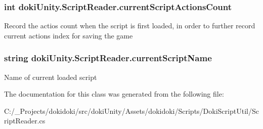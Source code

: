\subsubsection[{\texorpdfstring{current\+Script\+Actions\+Count}{currentScriptActionsCount}}]{\setlength{\rightskip}{0pt plus 5cm}int doki\+Unity.\+Script\+Reader.\+current\+Script\+Actions\+Count}\hypertarget{classdoki_unity_1_1_script_reader_ac9c6272e1333eb07927fc9cfabdbbd72}{}\label{classdoki_unity_1_1_script_reader_ac9c6272e1333eb07927fc9cfabdbbd72}


Record the actios count when the script is first loaded, in order to further record current action\textquotesingle{}s index for saving the game 

\subsubsection[{\texorpdfstring{current\+Script\+Name}{currentScriptName}}]{\setlength{\rightskip}{0pt plus 5cm}string doki\+Unity.\+Script\+Reader.\+current\+Script\+Name}\hypertarget{classdoki_unity_1_1_script_reader_aefa6d9778e246a8fabfe0b706b730023}{}\label{classdoki_unity_1_1_script_reader_aefa6d9778e246a8fabfe0b706b730023}


Name of current loaded script 



The documentation for this class was generated from the following file\+:\begin{DoxyCompactItemize}
\item 
C\+:/\+\_\+\+Projects/dokidoki/src/doki\+Unity/\+Assets/dokidoki/\+Scripts/\+Doki\+Script\+Util/Script\+Reader.\+cs\end{DoxyCompactItemize}
